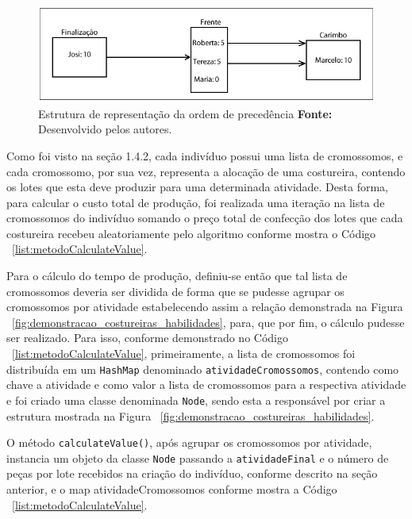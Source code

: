 
\begin{figure}[h!]
	\centerline{\includegraphics[scale=1.1]{./imagens/montagem_node.png}}
	\caption[Estrutura de representação da ordem de precedência]
	{Estrutura de representação da ordem de precedência \textbf{Fonte:}
	Desenvolvido pelos autores.}
	\label{fig:montagem_node}
\end{figure}


\par Como foi visto na seção 1.4.2, cada indivíduo possui uma lista de
cromossomos, e cada cromossomo, por sua vez, representa a alocação de uma
costureira, contendo os lotes que esta deve produzir para uma determinada atividade.
Desta forma, para calcular o custo total de produção, foi realizada uma iteração 
na lista de cromossomos do indivíduo somando o preço total de confecção dos lotes
que cada costureira recebeu aleatoriamente pelo algoritmo conforme mostra o Código
~\ref{list:metodoCalculateValue}.

\par Para o cálculo do tempo de produção, definiu-se então que tal lista de cromossomos deveria ser
dividida de forma que se pudesse agrupar os cromossomos por atividade estabelecendo assim a relação 
demonstrada na Figura ~\ref{fig:demonstracao_costureiras_habilidades}, para, que
por fim, o cálculo pudesse ser realizado.
Para isso, conforme demonstrado no Código ~\ref{list:metodoCalculateValue}, primeiramente, a lista de 
cromossomos foi distribuída em um \texttt{HashMap} denominado \texttt{atividadeCromossomos}, contendo 
como chave a atividade e como valor a lista de cromossomos para a respectiva atividade e foi criado uma 
classe denominada \texttt{Node}, sendo esta a responsável por criar a estrutura
mostrada na Figura ~\ref{fig:demonstracao_costureiras_habilidades}.

\par O método \texttt{calculateValue()}, após agrupar os cromossomos por atividade, 
 instancia um objeto da classe \texttt{Node} passando a \texttt{atividadeFinal} e o número de 
 peças por lote recebidos na criação do indivíduo, conforme descrito na seção anterior, e o map 
 atividadeCromossomos conforme mostra a Código ~\ref{list:metodoCalculateValue}.



